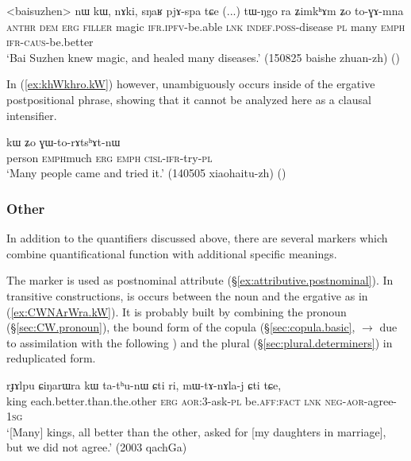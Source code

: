 \begin{exe}
\ex \label{ex:tWNgo.ZimkhAm}
\gll <baisuzhen> nɯ kɯ, nɤki, sŋaʁ pjɤ-spa tɕe (...) tɯ-ŋgo ra ʑimkʰɤm ʑo to-ɣɤ-mna \\
\textsc{anthr} \textsc{dem} \textsc{erg} \textsc{filler} magic \textsc{ifr}.\textsc{ipfv}-be.able \textsc{lnk} {  } \textsc{indef}.\textsc{poss}-disease \textsc{pl} many \textsc{emph} \textsc{ifr}-\textsc{caus}-be.better \\
\glt `Bai Suzhen knew magic, and healed many diseases.' (150825 baishe zhuan-zh)
()
\end{exe}

In (\ref{ex:khWkhro.kW}) however,  unambiguously occurs inside of the ergative postpositional phrase, showing that it cannot be analyzed here as a clausal intensifier.

\begin{exe}
\ex \label{ex:khWkhro.kW}
 kɯ ʑo ɣɯ-to-rɤtsʰɤt-nɯ \\
person \textsc{emph}\redp{}much \textsc{erg} \textsc{emph} \textsc{cisl}-\textsc{ifr}-try-\textsc{pl} \\
\glt `Many people came and tried it.' (140505 xiaohaitu-zh)
()
\end{exe}

\subsubsection{Other} \label{sec:quantifiers.other}
In addition to the quantifiers discussed above, there are several markers which combine  quantificational function with additional specific meanings.

The marker  is used as postnominal attribute (§\ref{ex:attributive.postnominal}). In transitive constructions, is occurs between the noun and the ergative  as in  (\ref{ex:CWNArWra.kW}). It is probably built by combining the pronoun   (§\ref{sec:CW.pronoun}), the bound form of the copula   (§\ref{sec:copula.basic},  $\rightarrow$  due to assimilation with the following ) and the plural  (§\ref{sec:plural.determiners}) in reduplicated form.
 
  
\begin{exe}
\ex \label{ex:CWNArWra.kW}
\gll   rɟɤlpu ɕiŋarɯra kɯ ta-tʰu-nɯ ɕti ri, mɯ-tɤ-nɤla-j ɕti tɕe, \\
king each.better.than.the.other \textsc{erg} \textsc{aor}:3\flobv{}-ask-\textsc{pl} be.\textsc{aff}:\textsc{fact} \textsc{lnk} \textsc{neg}-\textsc{aor}-agree-\textsc{1sg} \\
\glt `[Many] kings, all better than the other, asked for [my daughters in marriage], but we did not agree.' (2003 qachGa)
\end{exe}


